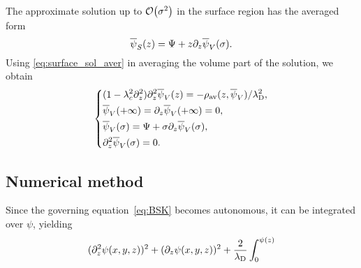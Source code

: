 The approximate solution up to $\order{\sigma^2}$ in the surface region has the averaged form
\begin{equation}\label{eq:surface_sol_aver}
    \overline{\psi}_S(z) = \Psi + z\partial_z\overline{\psi}_V(\sigma).
\end{equation}
Using \cref{eq:surface_sol_aver} in averaging the volume part of the solution, we obtain
\begin{equation}\label{eq:volume_aver}
    \begin{dcases}
        (1-\lambda_c^2\partial_z^2)\partial_z^2\overline{\psi}_V(z) = -\rho_\text{av}(z,\overline{\psi}_V)/\lambda_\text{D}^2, \\
        \overline{\psi}_V(+\infty) = \partial_z\overline{\psi}_V(+\infty) = 0, \\
        \overline{\psi}_V(\sigma) = \Psi + \sigma\partial_z\overline{\psi}_V(\sigma), \\
        \partial^2_z\overline{\psi}_V(\sigma) = 0.
    \end{dcases}
\end{equation}


\subsection{Numerical method}

Since the governing equation~\eqref{eq:BSK} becomes autonomous, it can be integrated over $\psi$, yielding
\begin{equation}\label{eq:integral}
    (\partial_z^2\psi(x,y,z))^2 + (\partial_z\psi(x,y,z))^2
    + \frac2{\lambda_\text{D}}\int_0^{\psi(z)}
\end{equation}
